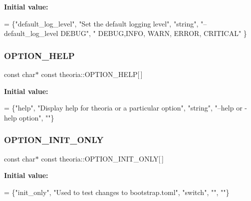 {\bfseries Initial value\+:}
\begin{DoxyCode}
= 
        \{\textcolor{stringliteral}{"default\_log\_level"}, \textcolor{stringliteral}{"Set the default logging level"}, \textcolor{stringliteral}{"string"}, \textcolor{stringliteral}{"--default\_log\_level DEBUG"}, \textcolor{stringliteral}{"
      DEBUG,INFO, WARN, ERROR, CRITICAL"} \}
\end{DoxyCode}
\mbox{\label{namespacetheoria_a2025e71f1a88a463cb39c47fb03db315}} 
\subsubsection{\texorpdfstring{O\+P\+T\+I\+O\+N\+\_\+\+H\+E\+LP}{OPTION\_HELP}}
{\footnotesize\ttfamily const char$\ast$ const theoria\+::\+O\+P\+T\+I\+O\+N\+\_\+\+H\+E\+LP\mbox{[}$\,$\mbox{]}}

{\bfseries Initial value\+:}
\begin{DoxyCode}
= 
        \{\textcolor{stringliteral}{"help"}, \textcolor{stringliteral}{"Display help for theoria or a particular option"}, \textcolor{stringliteral}{"string"}, \textcolor{stringliteral}{"--help or -help option"}, \textcolor{stringliteral}{""}\}
\end{DoxyCode}
\mbox{\label{namespacetheoria_aa0c25e32f0c1dde3f8b94e8a8b39faae}} 
\subsubsection{\texorpdfstring{O\+P\+T\+I\+O\+N\+\_\+\+I\+N\+I\+T\+\_\+\+O\+N\+LY}{OPTION\_INIT\_ONLY}}
{\footnotesize\ttfamily const char$\ast$ const theoria\+::\+O\+P\+T\+I\+O\+N\+\_\+\+I\+N\+I\+T\+\_\+\+O\+N\+LY\mbox{[}$\,$\mbox{]}}

{\bfseries Initial value\+:}
\begin{DoxyCode}
= 
        \{\textcolor{stringliteral}{"init\_only"}, \textcolor{stringliteral}{"Used to test changes to bootstrap.toml"}, \textcolor{stringliteral}{"switch"}, \textcolor{stringliteral}{""}, \textcolor{stringliteral}{""}\}
\end{DoxyCode}
\mbox{\label{namespacetheoria_a687e27177f877c3a06bedf5935a3ac4c}} 
